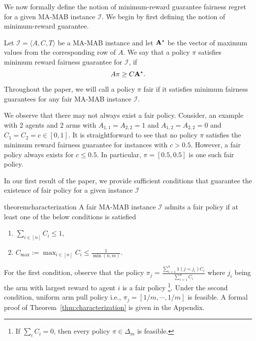 We now formally define the notion of minimum-reward guarantee fairness regret for a given MA-MAB instance $\mathcal{I}$. We begin by first defining the notion of minimum-reward guarantee.   

\begin{definition}
Let $\mathcal{I} = \langle A, C, T \rangle$ be  a MA-MAB instance and let  $\mathbf{A}^{\star}$ be the vector of maximum values from the corresponding row of $A$. We say  that a policy $\pi$ satisfies minimum reward fairness guarantee for    $\mathcal{I}$,  if 
\begin{equation}
A \pi \geq C   \mathbf{A}^{\star} .
\end{equation}  
\end{definition}

Throughout the paper, we  will call a policy $\pi$ fair if it satisfies minimum fairness guarantees for any fair MA-MAB instance $\mathcal{I}$. 



We observe that   there may not always exist a fair policy. Consider, an example with 2 agents and 2 arms with $A_{1,1} = A_{2,2} = 1$ and $A_{1,2} = A_{2,2} = 0$ and $C_{1} = C_{2}  = c\in [0, 1] $. It is straightforward to see that  no policy $\pi$ satisfies the minimum reward fairness guarantee for   instances with $c>0.5$.  However, a fair policy always exists for $c \leq 0.5$. In particular, $\pi = [0.5, 0.5]$ is one such  fair policy. 

In our first result of the paper, we provide sufficient conditions that guarantee the existence of fair policy for a given instance $\mathcal{I}$

\begin{restatable}{theorem}{characterization}
\label{thm:characterization}
A fair MA-MAB instance $\mathcal{I}$ admits a fair policy if at least one of the below conditions is satisfied 
\begin{enumerate}
    \item $\sum_{i \in [n]} C_i \leq 1$, 
    \item $ C_{\max} := \max_{i\in [n]} C_i \leq \frac{1}{\min(n,m)}$. 
\end{enumerate}
\end{restatable}

For the first condition,  observe that the policy  $   \pi_j = \frac{\sum_{i=1}^n \mathds{1}(j = j_i) C_i}{\sum_{i=1}^n C_i}$ where $j_i$ being the arm  with largest reward to agent $i$ is a fair policy \footnote{If $\sum_{i} C_i = 0$, then every policy $\pi \in \Delta_m$ is feasible. }. Under the second condition, uniform arm pull policy i.e., $ \pi_j = [1/m, \cdots, 1/m]$ is feasible.    A formal proof of Theorem~\ref{thm:characterization} is given in the Appendix. 

